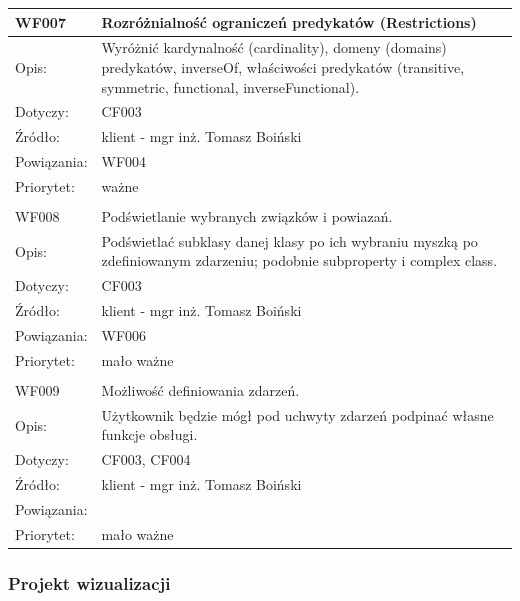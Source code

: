 \begin{center}
\begin{tabular}{|m{3cm}|m{9cm}|}
WF007 & Rozróżnialność ograniczeń predykatów (Restrictions) \\ \hline
Opis: & Wyróżnić kardynalność (cardinality), domeny (domains) predykatów, inverseOf, właściwości predykatów (transitive, symmetric, functional, inverseFunctional). \\ \hline
Dotyczy: &  CF003\\ \hline
Źródło: &  klient - mgr inż. Tomasz Boiński \\ \hline
Powiązania: & WF004\\ \hline
Priorytet: & ważne \\ \hline

\multicolumn{2}{c}{} \\
 \hline

WF008 &  Podświetlanie wybranych związków i powiazań.\\ \hline
Opis: &   Podświetlać subklasy danej klasy po ich wybraniu myszką po zdefiniowanym zdarzeniu; podobnie subproperty i complex class. \\ \hline
Dotyczy: &  CF003\\ \hline
Źródło: &  klient - mgr inż. Tomasz Boiński \\ \hline
Powiązania: & WF006\\ \hline
Priorytet: & mało ważne \\ \hline

\multicolumn{2}{c}{} \\
 \hline

WF009 & Możliwość definiowania zdarzeń. \\ \hline
Opis: &   Użytkownik będzie mógł pod uchwyty zdarzeń podpinać własne funkcje obsługi. \\ \hline
Dotyczy: & CF003, CF004  \\ \hline
Źródło: & klient - mgr inż. Tomasz Boiński \\ \hline
Powiązania: & \\ \hline
Priorytet: & mało ważne \\ \hline

\end{tabular}

\end{center}

\subsubsection{Projekt wizualizacji}

